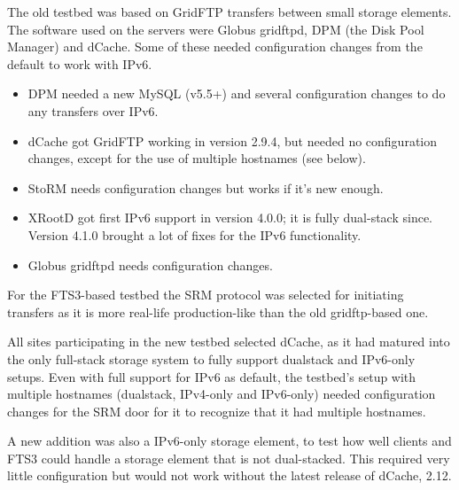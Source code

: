 The old testbed was based on GridFTP\cite{GFTP1.0, GFTP2.0} transfers between small storage elements. The software used on the servers were Globus gridftpd, 
DPM (the Disk Pool Manager) and dCache. 
Some of these needed configuration changes from the default to work with IPv6.

\begin{itemize}
\item DPM needed a new MySQL (v5.5+) and several configuration changes to do any transfers over IPv6.
\item dCache got GridFTP working in version 2.9.4, but needed no configuration changes, except for the use of multiple hostnames (see below).
\item StoRM needs configuration changes but works if it's new enough.
\item XRootD got first IPv6 support in version 4.0.0; it is fully dual-stack since. Version 4.1.0 brought a lot of fixes for the IPv6 functionality.
\item Globus gridftpd needs configuration changes.
\end{itemize}

For the FTS3-based testbed the SRM protocol \cite{SRM2.2} was selected for initiating transfers as it is more real-life production-like 
than the old gridftp-based one. 

All sites participating in the new testbed selected dCache, as it had matured into the only full-stack storage 
system to fully support dualstack and IPv6-only setups. Even with full support for IPv6 as default, the testbed's setup with 
multiple hostnames (dualstack, IPv4-only and IPv6-only) needed configuration changes for the SRM door for it to recognize that it had multiple hostnames.

A new addition was also a IPv6-only storage element, to test how well clients and FTS3 could handle a storage element that is not dual-stacked.
This required very little configuration but would not work without the latest release of dCache, 2.12.



